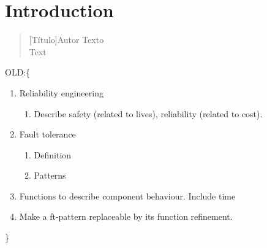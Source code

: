 \chapter{Introduction}

\begin{quotation}[Título]{Autor}
Texto \\
Text
\end{quotation}

\noindent OLD:\{
\begin{enumerate}
  \item Reliability engineering
  \begin{enumerate}
    \item Describe safety (related to lives), reliability (related to cost).
  \end{enumerate}
  \item Fault tolerance
  \begin{enumerate}
    \item Definition
    \item Patterns
  \end{enumerate}
  \item Functions to describe component behaviour. Include time
  \item Make a ft-pattern replaceable by its function refinement.
\end{enumerate}
\}

